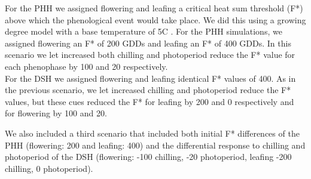 \documentclass{article}\usepackage[]{graphicx}\usepackage[]{color}
\begin{document}
\noindent For the PHH we assigned flowering and leafing a critical heat sum threshold (F*) above which the phenological event would take place. We did this using a growing degree model with a base temperature of 5\degree C \citep{}. For the PHH simulations, we assigned flowering an F* of 200 GDDs and leafing an F* of 400 GDDs. In this scenario we let increased both chilling and photoperiod reduce the F* value for each phenophase by 100 and 20 respectively.\\

\noindent For the DSH we assigned flowering and leafing identical F* values of 400. As in the previous scenario, we let increased chilling and photoperiod reduce the F* values, but these cues reduced the F* for leafing by 200 and 0 respectively and for flowering by 100 and 20.

\noindent We also included a third scenario that included both initial F* differences of the PHH (flowering: 200 and leafing: 400) and the differential response to chilling and photoperiod of the DSH (flowering: -100 chilling, -20 photoperiod, leafing -200 chilling, 0 photoperiod).

 
\end{document}
